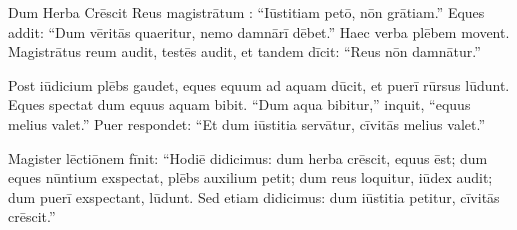 \documentclass[12pt]{nextbook}
\begin{document}
\begin{readersection}{Dum Herba Crēscit}
Reus magistrātum : “Iūstitiam petō, nōn grātiam.” Eques addit: “Dum vēritās quaeritur, nemo damnārī dēbet.” Haec verba plēbem movent. Magistrātus reum audit, testēs audit, et tandem dīcit: “Reus nōn damnātur.”

Post iūdicium plēbs gaudet, eques equum ad aquam dūcit, et puerī rūrsus lūdunt. Eques spectat dum equus aquam bibit. “Dum aqua bibitur,” inquit, “equus melius valet.” Puer respondet: “Et dum iūstitia servātur, cīvitās melius valet.”

Magister lēctiōnem fīnit: “Hodiē didicimus: dum herba crēscit, equus ēst; dum eques nūntium exspectat, plēbs auxilium petit; dum reus loquitur, iūdex audit; dum puerī exspectant, lūdunt. Sed etiam didicimus: dum iūstitia petitur, cīvitās crēscit.”

\end{readersection}
\end{document}
